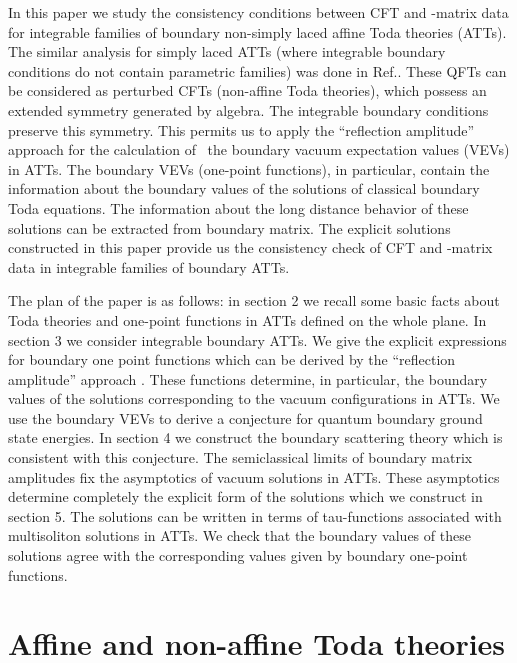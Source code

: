\documentclass[a4paper,12pt,titlepage,final]{article}
\begin{document}
In this paper we study the consistency conditions between CFT and
\coordHE{}-matrix data for integrable families
of boundary non-simply laced affine Toda
theories (ATTs). The similar analysis for simply laced ATTs (where
integrable boundary conditions do not contain parametric families) was done
in Ref.\cite{FO}. These QFTs can be considered as perturbed CFTs
(non-affine Toda theories),
 which possess an extended symmetry generated by
\coordHE{}algebra. The integrable boundary conditions preserve
this symmetry. This
permits us to apply the ``reflection amplitude'' approach \cite{FLZ} for the
calculation of \ the boundary vacuum expectation values (VEVs) in ATTs. The
boundary VEVs (one-point functions), in particular, contain the information
about the boundary values of the solutions of classical boundary Toda
equations. The information about the long distance behavior of these
solutions can be extracted from boundary \coordHE{}matrix. The explicit solutions
constructed in this paper provide us the consistency check of CFT and
\coordHE{}-matrix data in integrable families of boundary ATTs.

The plan of the paper is as follows: in section 2 we recall some basic
facts about Toda theories and one-point functions in ATTs defined on
the whole plane. In section 3 we consider integrable boundary ATTs. We
give the explicit expressions for boundary one point functions which
can be derived by the ``reflection amplitude'' approach
\cite{FLZ}. These functions determine, in particular, the boundary
values of the solutions corresponding to the vacuum configurations in
ATTs. We use the boundary VEVs to derive a conjecture for quantum
boundary ground state energies. In section 4 we construct the boundary
scattering theory which is consistent with this conjecture. The
semiclassical limits of boundary \coordHE{}matrix amplitudes fix the
asymptotics of vacuum solutions in ATTs. These asymptotics determine
completely the explicit form of the solutions which we construct in
section 5.  The solutions can be written in terms of tau-functions
associated with multisoliton solutions in ATTs. We check that the
boundary values of these solutions agree with the corresponding
values given by  boundary one-point functions.

\section{ Affine and non-affine Toda theories}
\end{document}
